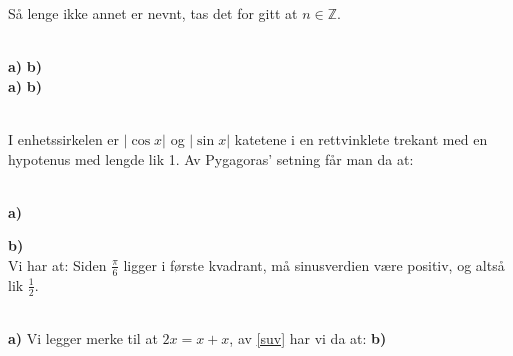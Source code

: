 %


\usepackage{xr}



Så lenge ikke annet er nevnt, tas det for gitt at $ n\in \mathbb{Z} $.

\\
\textbf{a)}
\textbf{b)}
\\
\textbf{a)}
\textbf{b)}

\\
I enhetssirkelen er $ |\cos x| $ og $ |\sin x| $ katetene i en rettvinklete trekant med en hypotenus med lengde lik 1. Av Pygagoras' setning får man da at:

\\
\textbf{a)} 

\textbf{b)} 
\newpage
{}\\
Vi har at:
Siden $ \frac{\pi}{6} $ ligger i første kvadrant, må sinusverdien være positiv, og altså lik $ \frac{1}{2} $.\vsk

\\
\textbf{a)} Vi legger merke til at $ {2x=x+x} $, av \eqref{suv} har vi da at:
\textbf{b)} 

